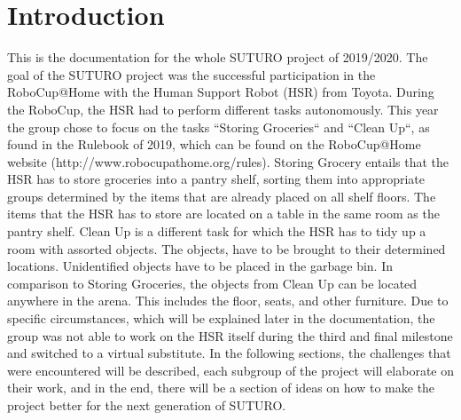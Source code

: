 \documentclass[main.tex]{subfiles}
\begin{document}
	\chapter{Introduction}
	\label{introduction}
	
This is the documentation for the whole SUTURO project of 2019/2020. The goal of the SUTURO project was the successful participation in the RoboCup@Home with the Human Support Robot (HSR) from Toyota. During the RoboCup, the HSR had to perform different tasks autonomously.
This year the group chose to focus on the tasks “Storing Groceries“ and “Clean Up“, as found in the Rulebook of 2019, which can be found on the RoboCup@Home website (http://www.robocupathome.org/rules). 
Storing Grocery entails that the HSR has to store groceries into a pantry shelf, sorting them into appropriate groups determined by the items that are already placed on all shelf floors. The items that the HSR has to store are located on a table in the same room as the pantry shelf.
Clean Up is a different task for which the HSR has to tidy up a room with assorted objects. The objects, have to be brought to their determined locations. Unidentified objects have to be placed in the garbage bin. In comparison to Storing Groceries, the objects from Clean Up can be located anywhere in the arena. This includes the floor, seats, and other furniture.
Due to specific circumstances, which will be explained later in the documentation, the group was not able to work on the HSR itself during the third and final milestone and switched to a virtual substitute.
In the following sections, the challenges that were encountered will be described, each subgroup of the project will elaborate on their work, and in the end, there will be a section of ideas on how to make the project better for the next generation of SUTURO.
	
\end{document}
